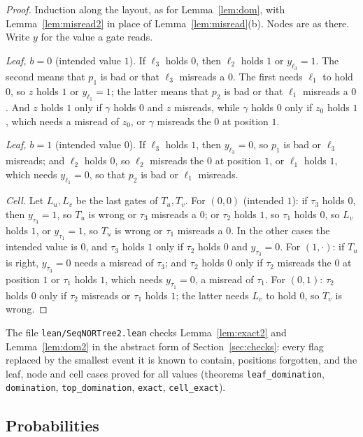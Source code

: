 \documentclass[11pt]{amsart}
\theoremstyle{definition}
\theoremstyle{remark}
\begin{document}
\begin{proof}
Induction along the layout, as for Lemma~\ref{lem:dom}, with Lemma~\ref{lem:misread2} in place of
Lemma~\ref{lem:misread}(b). Nodes are as there. Write $y$ for the value a gate reads.

\emph{Leaf, $b=0$} (intended value $1$). If $\ell_3$ holds $0$, then $\ell_2$ holds $1$ or
$y_{\ell_3}=1$. The second means that $p_1$ is bad or that $\ell_3$ misreads a $0$. The first
needs $\ell_1$ to hold $0$, so $z$ holds $1$ or $y_{\ell_1}=1$; the latter means that $p_2$ is bad
or that $\ell_1$ misreads a $0$. And $z$ holds $1$ only if $\gamma$ holds $0$ and $z$ misreads,
while $\gamma$ holds $0$ only if $z_0$ holds $1$, which needs a misread of $z_0$, or $\gamma$
misreads the $0$ at position $1$.

\emph{Leaf, $b=1$} (intended value $0$). If $\ell_3$ holds $1$, then $y_{\ell_3}=0$, so $p_1$ is bad
or $\ell_3$ misreads; and $\ell_2$ holds $0$, so $\ell_2$ misreads the $0$ at position $1$, or
$\ell_1$ holds $1$, which needs $y_{\ell_1}=0$, so that $p_2$ is bad or $\ell_1$ misreads.

\emph{Cell.} Let $L_u,L_v$ be the last gates of $T_u,T_v$. For $(0,0)$ (intended $1$): if $\tau_3$
holds $0$, then $y_{\tau_3}=1$, so $T_u$ is wrong or $\tau_3$ misreads a $0$; or $\tau_2$ holds $1$,
so $\tau_1$ holds $0$, so $L_v$ holds $1$, or $y_{\tau_1}=1$, so $T_u$ is wrong or $\tau_1$ misreads
a $0$. In the other cases the intended value is $0$, and $\tau_3$ holds $1$ only if $\tau_2$ holds
$0$ and $y_{\tau_3}=0$. For $(1,\cdot)$: if $T_u$ is right, $y_{\tau_3}=0$ needs a misread of
$\tau_3$; and $\tau_2$ holds $0$ only if $\tau_2$ misreads the $0$ at position $1$ or $\tau_1$
holds $1$, which needs $y_{\tau_1}=0$, a misread of $\tau_1$. For $(0,1)$: $\tau_2$ holds $0$ only
if $\tau_2$ misreads or $\tau_1$ holds $1$; the latter needs $L_v$ to hold $0$, so $T_v$ is wrong.
\end{proof}

\noindent The file \texttt{lean/SeqNORTree2.lean} checks Lemma~\ref{lem:exact2} and
Lemma~\ref{lem:dom2} in the abstract form of Section~\ref{sec:checks}: every flag replaced by the
smallest event it is known to contain, positions forgotten, and the leaf, node and cell cases
proved for all values (theorems \texttt{leaf\_domination}, \texttt{domination},
\texttt{top\_domination}, \texttt{exact}, \texttt{cell\_exact}).

\subsection{Probabilities}
\end{document}
